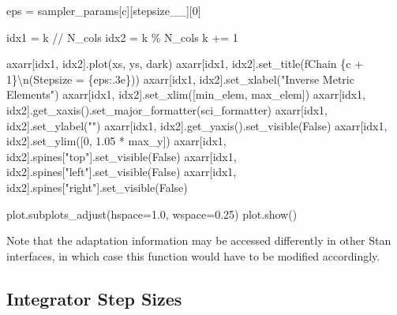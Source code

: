 \documentclass[
  letterpaper,
  DIV=11,
  numbers=noendperiod]{scrartcl}
\newenvironment{Shaded}{\begin{snugshade}}{\end{snugshade}}
\newcommand{\CharTok}[1]{\textcolor[rgb]{0.13,0.47,0.30}{#1}}
\newcommand{\DecValTok}[1]{\textcolor[rgb]{0.68,0.00,0.00}{#1}}
\newcommand{\FloatTok}[1]{\textcolor[rgb]{0.68,0.00,0.00}{#1}}
\newcommand{\NormalTok}[1]{\textcolor[rgb]{0.00,0.23,0.31}{#1}}
\newcommand{\OperatorTok}[1]{\textcolor[rgb]{0.37,0.37,0.37}{#1}}
\newcommand{\SpecialCharTok}[1]{\textcolor[rgb]{0.37,0.37,0.37}{#1}}
\newcommand{\SpecialStringTok}[1]{\textcolor[rgb]{0.13,0.47,0.30}{#1}}
\newcommand{\StringTok}[1]{\textcolor[rgb]{0.13,0.47,0.30}{#1}}
\newcommand{\VariableTok}[1]{\textcolor[rgb]{0.07,0.07,0.07}{#1}}
\begin{document}
\begin{Shaded}
\begin{Highlighting}[]
\NormalTok{    eps }\OperatorTok{=}\NormalTok{ sampler\_params[c][}\StringTok{\textquotesingle{}stepsize\_\_\textquotesingle{}}\NormalTok{][}\DecValTok{0}\NormalTok{]}
    
\NormalTok{    idx1 }\OperatorTok{=}\NormalTok{ k }\OperatorTok{//}\NormalTok{ N\_cols}
\NormalTok{    idx2 }\OperatorTok{=}\NormalTok{ k }\OperatorTok{\%}\NormalTok{ N\_cols}
\NormalTok{    k }\OperatorTok{+=} \DecValTok{1}
    
\NormalTok{    axarr[idx1, idx2].plot(xs, ys, dark)}
\NormalTok{    axarr[idx1, idx2].set\_title(}\SpecialStringTok{f\textquotesingle{}Chain }\SpecialCharTok{\{}\NormalTok{c }\OperatorTok{+} \DecValTok{1}\SpecialCharTok{\}}\CharTok{\textbackslash{}n}\SpecialStringTok{(Stepsize = }\SpecialCharTok{\{}\NormalTok{eps}\SpecialCharTok{:.3e\}}\SpecialStringTok{)\textquotesingle{}}\NormalTok{)}
\NormalTok{    axarr[idx1, idx2].set\_xlabel(}\StringTok{"Inverse Metric Elements"}\NormalTok{)}
\NormalTok{    axarr[idx1, idx2].set\_xlim([min\_elem, max\_elem])}
\NormalTok{    axarr[idx1, idx2].get\_xaxis().set\_major\_formatter(sci\_formatter)}
\NormalTok{    axarr[idx1, idx2].set\_ylabel(}\StringTok{""}\NormalTok{)}
\NormalTok{    axarr[idx1, idx2].get\_yaxis().set\_visible(}\VariableTok{False}\NormalTok{)}
\NormalTok{    axarr[idx1, idx2].set\_ylim([}\DecValTok{0}\NormalTok{, }\FloatTok{1.05} \OperatorTok{*}\NormalTok{ max\_y])}
\NormalTok{    axarr[idx1, idx2].spines[}\StringTok{"top"}\NormalTok{].set\_visible(}\VariableTok{False}\NormalTok{)}
\NormalTok{    axarr[idx1, idx2].spines[}\StringTok{"left"}\NormalTok{].set\_visible(}\VariableTok{False}\NormalTok{)}
\NormalTok{    axarr[idx1, idx2].spines[}\StringTok{"right"}\NormalTok{].set\_visible(}\VariableTok{False}\NormalTok{)}
  
\NormalTok{  plot.subplots\_adjust(hspace}\OperatorTok{=}\FloatTok{1.0}\NormalTok{, wspace}\OperatorTok{=}\FloatTok{0.25}\NormalTok{)}
\NormalTok{  plot.show()}
\end{Highlighting}
\end{Shaded}

Note that the adaptation information may be accessed differently in
other Stan interfaces, in which case this function would have to be
modified accordingly.

\hypertarget{integrator-step-sizes}{%
\subsection{Integrator Step Sizes}\label{integrator-step-sizes}}
\end{document}
